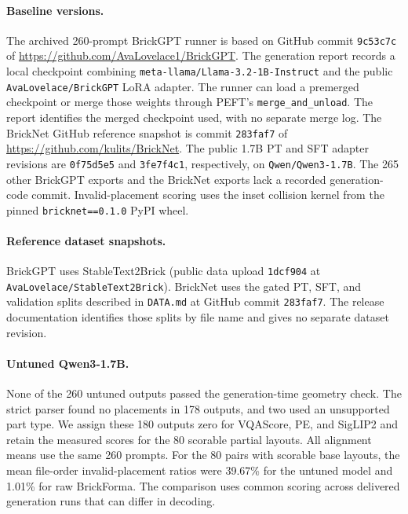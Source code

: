\documentclass[letterpaper]{article} %
\begin{document}
\begin{samepage}
\paragraph{Baseline versions.} The archived 260-prompt BrickGPT runner is based on GitHub commit \texttt{9c53c7c} of \url{https://github.com/AvaLovelace1/BrickGPT}. The generation report records a local checkpoint combining \texttt{meta-llama/Llama-3.2-1B-Instruct} and the public \texttt{AvaLovelace/BrickGPT} LoRA adapter. The runner can load a premerged checkpoint or merge those weights through PEFT's \texttt{merge\_and\_unload}. The report identifies the merged checkpoint used, with no separate merge log. The BrickNet GitHub reference snapshot is commit \texttt{283faf7} of \url{https://github.com/kulits/BrickNet}. The public 1.7B PT and SFT adapter revisions are \texttt{0f75d5e5} and \texttt{3fe7f4c1}, respectively, on \texttt{Qwen/Qwen3-1.7B}. The 265 other BrickGPT exports and the BrickNet exports lack a recorded generation-code commit. Invalid-placement scoring uses the inset collision kernel from the pinned \texttt{bricknet==0.1.0} PyPI wheel.

\paragraph{Reference dataset snapshots.} BrickGPT uses StableText2Brick (public data upload \texttt{1dcf904} at \texttt{AvaLovelace/StableText2Brick}). BrickNet uses the gated PT, SFT, and validation splits described in \texttt{DATA.md} at GitHub commit \texttt{283faf7}. The release documentation identifies those splits by file name and gives no separate dataset revision.
\end{samepage}


\paragraph{Untuned Qwen3-1.7B.} None of the 260 untuned outputs passed the generation-time geometry check. The strict parser found no placements in 178 outputs, and two used an unsupported part type. We assign these 180 outputs zero for VQAScore, PE, and SigLIP2 and retain the measured scores for the 80 scorable partial layouts. All alignment means use the same 260 prompts. For the 80 pairs with scorable base layouts, the mean file-order invalid-placement ratios were 39.67\% for the untuned model and 1.01\% for raw BrickForma. The comparison uses common scoring across delivered generation runs that can differ in decoding.
\end{document}
